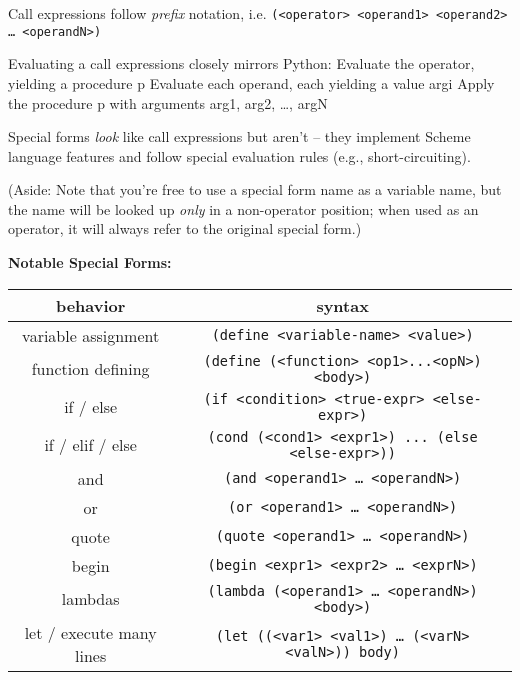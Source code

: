Call expressions follow \textit{prefix} notation, i.e.
\texttt{(<operator> <operand1> <operand2> … <operandN>)}

Evaluating a call expressions closely mirrors Python:
Evaluate the operator, yielding a procedure p
Evaluate each operand, each yielding a value argi
Apply the procedure p with arguments arg1, arg2, …, argN

Special forms \textit{look} like call expressions but aren’t -- they implement Scheme language features and follow special evaluation rules (e.g., short-circuiting). 

(Aside: Note that you’re free to use a special form name as a variable name, but the name will be looked up \textit{only} in a non-operator position; when used as an operator, it will always refer to the original special form.)

\textbf{Notable Special Forms:}
\begin{center}
\begin{tabular}{ |c|c| }
    \hline
    behavior & syntax \\
    \hline
    variable assignment   & \texttt{(define <variable-name> <value>)} \\
    \hline
    function defining & \texttt{(define (<function> <op1>...<opN>) <body>)} \\
    \hline
    if / else & \texttt{(if <condition> <true-expr> <else-expr>)} \\
    \hline
    if / elif / else & \texttt{(cond (<cond1> <expr1>) ... (else <else-expr>))} \\
    \hline
    and & \texttt{(and <operand1> … <operandN>)} \\
    \hline
    or & \texttt{(or <operand1> … <operandN>)} \\
    \hline
    quote & \texttt{(quote <operand1> … <operandN>)} \\
    \hline
    begin & \texttt{(begin <expr1> <expr2> … <exprN>)} \\
    \hline
    lambdas & \texttt{(lambda (<operand1> … <operandN>) <body>)} \\
    \hline
    let / execute many lines & \texttt{(let ((<var1> <val1>) … (<varN> <valN>)) body)} \\
    \hline
\end{tabular}
\end{center}